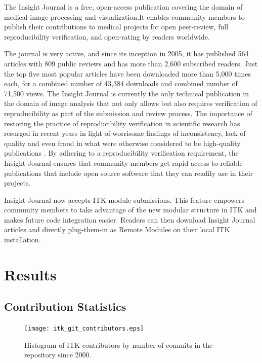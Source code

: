 \documentclass{frontiersENG} %
\begin{document}
The Insight Journal is a free, open-access publication covering the domain of
medical image processing and visualization.It enables community members to
publish their contributions to medical projects for open peer-review, full
reproducibility verification, and open-rating by readers worldwide.

%
%
%
The journal is very active, and since its inception in 2005, it has published
564 articles with 809 public reviews and has more than 2,600 subscribed
readers. Just the top five most popular articles have been downloaded more than
5,000 times each, for a combined number of 43,384 downloads and combined number
of 71,500 views. The Insight Journal is currently the only technical
publication in the domain of image analysis that not only allows but also
requires verification of reproducibility as part of the submission and review
process. The importance of restoring the practice of reproducibility
verification in scientific research has resurged in recent years in light of
worrisome findings of inconsistency, lack of quality and even fraud in what
were otherwise considered to be high-quality publications \cite{Begley2012}. By
adhering to a reproducibility verification requirement, the Insight Journal
ensures that community members get rapid access to reliable publications that
include open source software that they can readily use in their projects.

Insight Journal now accepts ITK module submissions. This feature empowers
community members to take advantage of the new modular structure in ITK and
makes future code integration easier. Readers can then download Insight Journal
articles and directly plug-them-in as Remote Modules on their local ITK
installation.


\section{Results}

\subsection{Contribution Statistics}

\begin{figure}
  \centering
    \texttt{[image: itk\_git\_contributors.eps]}
    \caption{Histogram of ITK contributors by number of commits in the repository since 2000.}
    \label{fig:ITKGitContributors}
\end{figure}
\end{document}
